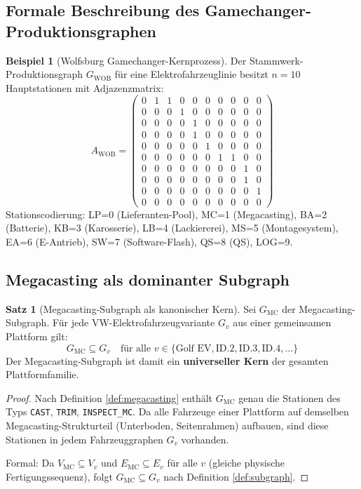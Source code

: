 ﻿\documentclass[a4paper,12pt]{article}
\theoremstyle{definition}
\newtheorem{beispiel}{Beispiel}
\newtheorem{satz}{Satz}
\begin{document}
\subsection{Formale Beschreibung des Gamechanger-Produktionsgraphen}

\begin{beispiel}[Wolfsburg Gamechanger-Kernprozess]
\label{bsp:wolfsburg}
Der Stammwerk-Produktionsgraph $G_{\mathrm{WOB}}$ für eine Elektrofahrzeuglinie besitzt
$n = 10$ Hauptstationen mit Adjazenzmatrix:
\[
A_{\mathrm{WOB}} = \begin{pmatrix}
0 & 1 & 1 & 0 & 0 & 0 & 0 & 0 & 0 & 0 \\
0 & 0 & 0 & 1 & 0 & 0 & 0 & 0 & 0 & 0 \\
0 & 0 & 0 & 0 & 1 & 0 & 0 & 0 & 0 & 0 \\
0 & 0 & 0 & 0 & 1 & 0 & 0 & 0 & 0 & 0 \\
0 & 0 & 0 & 0 & 0 & 1 & 0 & 0 & 0 & 0 \\
0 & 0 & 0 & 0 & 0 & 0 & 1 & 1 & 0 & 0 \\
0 & 0 & 0 & 0 & 0 & 0 & 0 & 0 & 1 & 0 \\
0 & 0 & 0 & 0 & 0 & 0 & 0 & 0 & 1 & 0 \\
0 & 0 & 0 & 0 & 0 & 0 & 0 & 0 & 0 & 1 \\
0 & 0 & 0 & 0 & 0 & 0 & 0 & 0 & 0 & 0
\end{pmatrix}
\]
Stationscodierung: LP=0 (Lieferanten-Pool), MC=1 (Megacasting), BA=2 (Batterie), KB=3 (Karosserie),
LB=4 (Lackiererei), MS=5 (Montagesystem), EA=6 (E-Antrieb), SW=7 (Software-Flash), QS=8 (QS), LOG=9.
\end{beispiel}

\subsection{Megacasting als dominanter Subgraph}

\begin{satz}[Megacasting-Subgraph als kanonischer Kern]
\label{satz:megacasting_kern}
Sei $G_{\mathrm{MC}}$ der Megacasting-Subgraph. Für jede VW-Elektrofahrzeugvariante
$G_v$ aus einer gemeinsamen Plattform gilt:
\[
G_{\mathrm{MC}} \subseteq G_v \quad \text{für alle } v \in \{\text{Golf EV}, \text{ID.2}, \text{ID.3}, \text{ID.4}, \ldots\}
\]
Der Megacasting-Subgraph ist damit ein \textbf{universeller Kern} der gesamten Plattformfamilie.
\end{satz}

\begin{proof}
Nach Definition \ref{def:megacasting} enthält $G_{\mathrm{MC}}$ genau die Stationen des Typs
\texttt{CAST}, \texttt{TRIM}, \texttt{INSPECT\_MC}. Da alle Fahrzeuge einer Plattform
auf demselben Megacasting-Strukturteil (Unterboden, Seitenrahmen) aufbauen, sind diese
Stationen in jedem Fahrzeuggraphen $G_v$ vorhanden.

Formal: Da $V_{\mathrm{MC}} \subseteq V_v$ und $E_{\mathrm{MC}} \subseteq E_v$ für alle
$v$ (gleiche physische Fertigungssequenz), folgt $G_{\mathrm{MC}} \subseteq G_v$
nach Definition \ref{def:subgraph}.
\end{proof}
\end{document}
